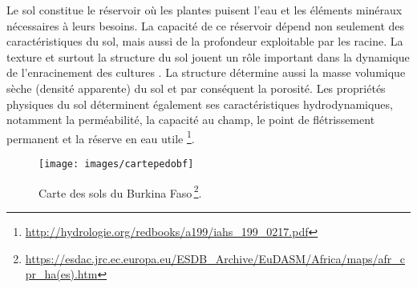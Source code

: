 \documentclass[a4paper,11pt]{article}
\begin{document}
Le sol constitue le réservoir où les plantes puisent l'eau et les
éléments minéraux nécessaires à leurs besoins. La capacité de ce
réservoir dépend non seulement des caractéristiques du sol, mais aussi
de la profondeur exploitable par les racine. La texture et surtout la
structure du sol jouent un rôle important dans la dynamique de
l'enracinement des cultures \cite{Chopart_1980}. La structure
détermine aussi la masse volumique sèche (densité apparente) du sol et
par conséquent la porosité. Les propriétés physiques du sol
déterminent également ses caractéristiques hydrodynamiques, notamment
la perméabilité, la capacité au champ, le point de flétrissement
permanent et la réserve en eau utile
\footnote{\url{http://hydrologie.org/redbooks/a199/iahs_199_0217.pdf}}.


\begin{figure}%
  \begin{center}
    \texttt{[image: images/cartepedobf]}
  \end{center}
  \caption{Carte des sols du Burkina Faso\,\protect\footnote{\protect\url{https://esdac.jrc.ec.europa.eu/ESDB_Archive/EuDASM/Africa/maps/afr_cpr_ha(es).htm}}.}
  \label{fig:carte_sols_burkina}
\end{figure}

\end{document}
